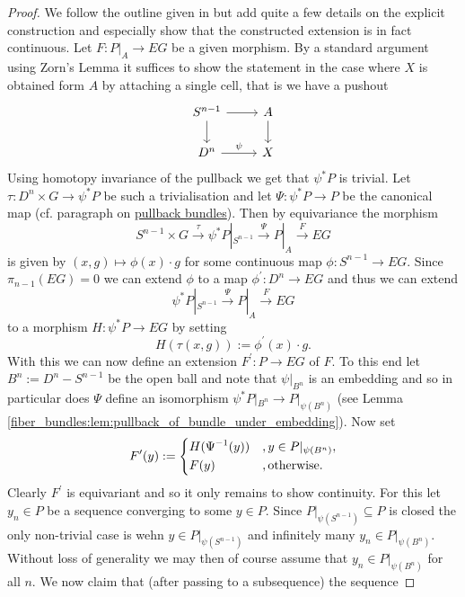 \begin{proof}
    We follow the outline given in \cite{ebert_bordism_script} but add quite a few details on the explicit construction and especially show that the constructed extension is in fact continuous. Let $F \colon P|_A \to EG$ be a given morphism. By a standard argument using Zorn's Lemma it suffices to show the statement in the case where $X$ is obtained form $A$ by attaching a single cell, that is we have a pushout 
    \[\begin{tikzcd}
	{S^{n-1}} & A \\
	{D^n} & X
	\arrow[from=1-1, to=1-2]
	\arrow[from=1-1, to=2-1]
	\arrow[from=1-2, to=2-2]
	\arrow["\psi", from=2-1, to=2-2]
    \end{tikzcd}\]
    Using homotopy invariance of the pullback we get that $\psi^\ast P$ is trivial. Let $\tau \colon D^n \times G \to \psi^\ast P$ be such a trivialisation and let $\Psi \colon \psi^\ast P \to P$ be the canonical map (cf. paragraph on \hyperlink{fiber_bundles:headline:pullback_bundles}{pullback bundles}). Then by equivariance the morphism 
    \[
    S^{n-1} \times G \xrightarrow{\tau} \psi^\ast P|_{S^{n-1}} \xrightarrow{\Psi} P|_A \xrightarrow{F} EG
    \]
    is given by $(x,g) \mapsto \phi(x) \cdot g$ for some continuous map $\phi \colon S^{n-1} \to EG$. Since $\pi_{n-1}(EG) = 0$ we can extend $\phi$ to a map $\phi^\prime \colon D^n \to EG$ and thus we can extend 
    \[
     \psi^\ast P|_{S^{n-1}} \xrightarrow{\Psi} P|_A \xrightarrow{F} EG
    \]
    to a morphism $H \colon \psi^\ast P \to EG$ by setting 
    \[
    H(\tau(x,g)) := \phi^\prime(x) \cdot g.
    \]
    With this we can now define an extension $F^\prime \colon P \to EG$ of $F$. To this end let $B^n := D^n - S^{n-1}$ be the open ball and note that $\psi|_{B^n}$ is an embedding and so in particular does $\Psi$ define an isomorphism $\psi^\ast P|_{B^n} \to P|_{\psi(B^n)}$ \;(see Lemma \ref{fiber_bundles:lem:pullback_of_bundle_under_embedding}). Now set 
    \[
    F^\prime(y) := \begin{dcases}
        H(\Psi^{-1}(y)) &, y \in P|_{\psi(B^n)}, \\
        F(y) &, \text{otherwise}.
    \end{dcases}
    \]
    Clearly $F^\prime$ is equivariant and so it only remains to show continuity. For this let $y_n \in P$ be a sequence converging to some $y \in P$. Since $P|_{\psi(S^{n-1})} \subseteq P$ is closed the only non-trivial case is wehn $y \in P|_{\psi(S^{n-1})}$ and infinitely many $y_n \in P|_{\psi(B^n)}$. Without loss of generality we may then of course assume that $y_n \in P|_{\psi(B^n)}$ for all $n$. We now claim that (after passing to a subsequence) the sequence 

\end{proof}
